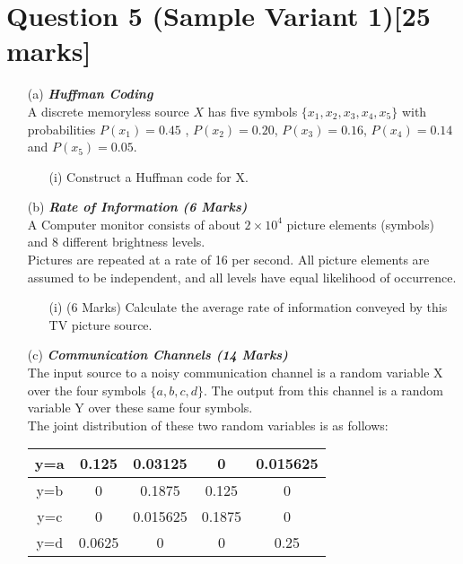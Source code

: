 \documentclass[]{article}
\begin{document}
\section{Question 5 (Sample Variant 1)[25 marks]}

\begin{itemize}
\item[(a)] \textbf{\textit{Huffman Coding }}\\
A discrete memoryless source $X$ has five symbols $\{x_1,x_2,x_3,x_4,x_5\}$ with probabilities $P(x_1) = 0.45$ , $P(x_2) = 0.20$, $P(x_3) = 0.16$, $P(x_4) = 0.14$ and $P(x_5) = 0.05$.

\begin{itemize}
\item[(i)]  Construct a Huffman code for X.
\end{itemize}

\item[(b)] \textbf{\textit{Rate of Information (6 Marks)}}\\
A Computer monitor consists of about $2 \times 10^4$ picture elements (symbols) and 8
different brightness levels.\\
\newline
Pictures are repeated at a rate of 16 per second. All picture elements
are assumed to be independent, and all levels have equal likelihood of occurrence. 
\begin{itemize}
\item[(i)](6 Marks) Calculate the
average rate of information conveyed by this TV picture source.
\end{itemize}


\item[(c)] \textbf{\textit{Communication Channels (14 Marks)}}\\
The input source to a noisy communication channel is a random variable X over the
four symbols $\{a, b, c, d\}$. The output from this channel is a random variable Y over these same
four symbols. \\
\noindent 
The joint distribution of these two random variables is as follows:\\ 
\begin{center}
\begin{tabular}{|c|c|c|c|c|}
\hline
y=a & 0.125&0.03125&0&0.015625\\ \hline
y=b & 0&0.1875&0.125&0\\ \hline
y=c & 0&0.015625&0.1875&0\\ \hline
y=d & 0.0625&0&0&0.25\\ \hline
\end{tabular}
\end{center}


\end{itemize}
\end{document}
